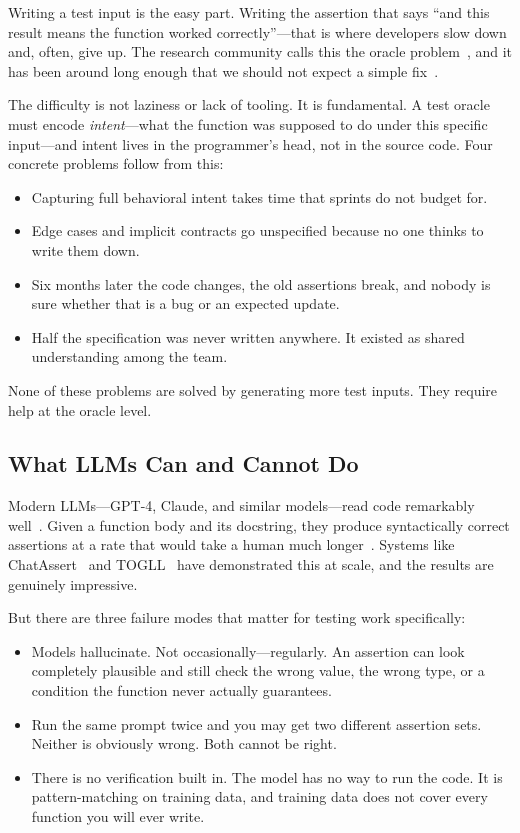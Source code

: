 \documentclass[conference]{IEEEtran}
\begin{document}
Writing a test input is the easy part. Writing the assertion that says ``and this result means the function worked correctly''—that is where developers slow down and, often, give up. The research community calls this the oracle problem~\cite{barr2015oracle}, and it has been around long enough that we should not expect a simple fix~\cite{molina2025test,pezze2014automated}.

The difficulty is not laziness or lack of tooling. It is fundamental. A test oracle must encode \emph{intent}—what the function was supposed to do under this specific input—and intent lives in the programmer's head, not in the source code. Four concrete problems follow from this:

\begin{itemize}
\item Capturing full behavioral intent takes time that sprints do not budget for.
\item Edge cases and implicit contracts go unspecified because no one thinks to write them down.
\item Six months later the code changes, the old assertions break, and nobody is sure whether that is a bug or an expected update.
\item Half the specification was never written anywhere. It existed as shared understanding among the team.
\end{itemize}

None of these problems are solved by generating more test inputs. They require help at the oracle level.

\subsection{What LLMs Can and Cannot Do}

Modern LLMs—GPT-4, Claude, and similar models—read code remarkably well~\cite{jiang2024survey_codellm,davis2024understanding_llm_code}. Given a function body and its docstring, they produce syntactically correct assertions at a rate that would take a human much longer~\cite{xu2022systematic}. Systems like ChatAssert~\cite{hayet2024chatassert} and TOGLL~\cite{hossain2024togll} have demonstrated this at scale, and the results are genuinely impressive.

But there are three failure modes that matter for testing work specifically:

\begin{itemize}
\item Models hallucinate. Not occasionally—regularly. An assertion can look completely plausible and still check the wrong value, the wrong type, or a condition the function never actually guarantees.
\item Run the same prompt twice and you may get two different assertion sets. Neither is obviously wrong. Both cannot be right.
\item There is no verification built in. The model has no way to run the code. It is pattern-matching on training data, and training data does not cover every function you will ever write.
\end{itemize}
\end{document}
